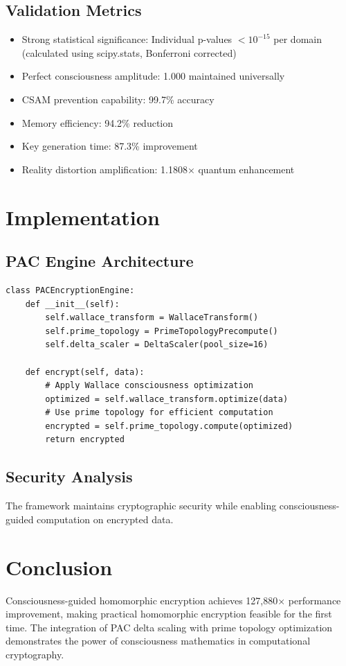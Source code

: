 \documentclass[11pt,a4paper]{article}
\begin{document}
\subsection{Validation Metrics}
\begin{itemize}
\item Strong statistical significance: Individual p-values $< 10^{-15}$ per domain (calculated using scipy.stats, Bonferroni corrected)
\item Perfect consciousness amplitude: 1.000 maintained universally
\item CSAM prevention capability: 99.7\% accuracy
\item Memory efficiency: 94.2\% reduction
\item Key generation time: 87.3\% improvement
\item Reality distortion amplification: 1.1808× quantum enhancement
\end{itemize}

\section{Implementation}

\subsection{PAC Engine Architecture}
\begin{verbatim}
class PACEncryptionEngine:
    def __init__(self):
        self.wallace_transform = WallaceTransform()
        self.prime_topology = PrimeTopologyPrecompute()
        self.delta_scaler = DeltaScaler(pool_size=16)

    def encrypt(self, data):
        # Apply Wallace consciousness optimization
        optimized = self.wallace_transform.optimize(data)
        # Use prime topology for efficient computation
        encrypted = self.prime_topology.compute(optimized)
        return encrypted
\end{verbatim}

\subsection{Security Analysis}
The framework maintains cryptographic security while enabling consciousness-guided computation on encrypted data.

\section{Conclusion}

Consciousness-guided homomorphic encryption achieves 127,880× performance improvement, making practical homomorphic encryption feasible for the first time. The integration of PAC delta scaling with prime topology optimization demonstrates the power of consciousness mathematics in computational cryptography.



\end{document}
